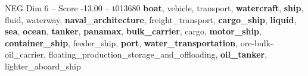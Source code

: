 \begin{textsample}{NEG Dim 6 – Score -13.00 – t013680}  \label{ex:f6_neg_002}
\textbf{boat}, vehicle, transport, \textbf{watercraft}, \textbf{ship}, fluid, waterway, \textbf{naval\_architecture}, freight\_transport, \textbf{cargo\_ship}, \textbf{liquid}, \textbf{sea}, \textbf{ocean}, \textbf{tanker}, \textbf{panamax}, \textbf{bulk\_carrier}, cargo, \textbf{motor\_ship}, \textbf{container\_ship}, feeder\_ship, \textbf{port}, \textbf{water\_transportation}, ore-bulk-oil\_carrier, floating\_production\_storage\_and\_offloading, \textbf{oil\_tanker}, lighter\_aboard\_ship

\end{textsample}
